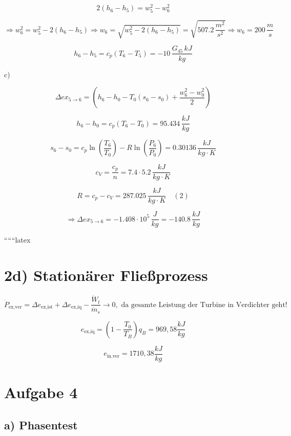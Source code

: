 \[
2(h_6 - h_5) = w_5^2 - w_6^2
\]

\[
\Rightarrow w_6^2 = w_5^2 - 2(h_6 - h_5) \Rightarrow w_6 = \sqrt{w_5^2 - 2(h_6 - h_5)} = \sqrt{507.2 \, \frac{m^2}{s^2}} \Rightarrow w_6 = 200 \, \frac{m}{s}
\]

\[
h_6 - h_5 = c_p (T_6 - T_5) = -10 \, \frac{G_{45} \, kJ}{kg}
\]

c)

\[
\Delta ex_{5 \rightarrow 6} = (h_6 - h_0 - T_0 (s_6 - s_0) + \frac{w_6^2 - w_0^2}{2})
\]

\[
h_6 - h_0 = c_p (T_6 - T_0) = 95.434 \, \frac{kJ}{kg}
\]

\[
s_6 - s_0 = c_p \ln \left( \frac{T_6}{T_0} \right) - R \ln \left( \frac{P_6}{P_0} \right) = 0.30136 \, \frac{kJ}{kg \cdot K}
\]

\[
c_V = \frac{c_p}{n} = 7.4 \cdot 5.2 \, \frac{kJ}{kg \cdot K}
\]

\[
R = c_p - c_V = 287.025 \, \frac{kJ}{kg \cdot K} \quad (2)
\]

\[
\Rightarrow \Delta ex_{5 \rightarrow 6} = -1.408 \cdot 10^5 \, \frac{J}{kg} = -140.8 \, \frac{kJ}{kg}
\]

``````latex


\section*{2d) Stationärer Fließprozess}

\[
\dot{P}_{\text{ex,ver}} = \Delta e_{\text{ex,ist}} + \Delta e_{\text{ex,iq}} - \frac{\dot{W}_t}{\dot{m}_s} \rightarrow 0, \text{ da gesamte Leistung der Turbine in Verdichter geht!}
\]

\[
e_{\text{ex,iq}} = \left(1 - \frac{T_0}{T_B}\right) q_B = 969,58 \frac{kJ}{kg}
\]

\[
e_{\text{in,ver}} = 1710,38 \frac{kJ}{kg}
\]

\section*{Aufgabe 4}

\subsection*{a) Phasentest}

